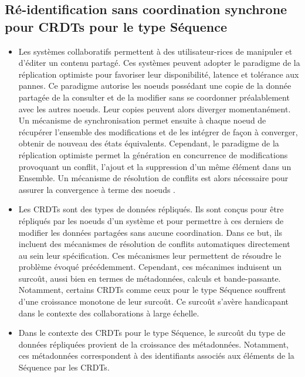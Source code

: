 \subsection{Ré-identification sans coordination synchrone pour \acp{CRDT} pour le type Séquence}

\begin{itemize}
    \item Les systèmes collaboratifs permettent à des utilisateur-rices de manipuler et d'éditer un contenu partagé.
        Ces systèmes peuvent adopter le paradigme de la réplication optimiste \cite{2005-optimistic-replication-saito} pour favoriser leur disponibilité, latence et tolérance aux pannes.
        Ce paradigme autorise les noeuds possédant une copie de la donnée partagée de la consulter et de la modifier sans se coordonner préalablement avec les autres noeuds.
        Leur copies peuvent alors diverger momentanément.
        Un mécanisme de synchronisation permet ensuite à chaque noeud de récupérer l'ensemble des modifications et de les intégrer de façon à converger, \ie obtenir de nouveau des états équivalents.
        Cependant, le paradigme de la réplication optimiste permet la génération en concurrence de modifications provoquant un conflit, \eg l'ajout et la suppression d'un même élément dans un Ensemble.
        Un mécanisme de résolution de conflits est alors nécessaire pour assurer la convergence à terme des noeuds \cite{10.1145/224057.224070}.
    \item Les \acp{CRDT} \cite{2007-crdt-shapiro,shapiro_2011_crdt} sont des types de données répliqués.
        Ils sont conçus pour être répliqués par les noeuds d'un système et pour permettre à ces derniers de modifier les données partagées sans aucune coordination.
        Dans ce but, ils incluent des mécanismes de résolution de conflits automatiques directement au sein leur spécification.
        Ces mécanismes leur permettent de résoudre le problème évoqué précédemment.
        Cependant, ces mécanimes induisent un surcoût, aussi bien en termes de métadonnées, calculs et bande-passante.
        Notamment, certains \acp{CRDT} comme ceux pour le type Séquence souffrent d'une croissance monotone de leur surcoût.
        Ce surcoût s'avère handicapant dans le contexte des collaborations à large échelle.
    \item Dans le contexte des \acp{CRDT} pour le type Séquence, le surcoût du type de données répliquées provient de la croissance des métadonnées.
        Notamment, ces métadonnées correspondent à des identifiants associés aux éléments de la Séquence par les \acp{CRDT}.

\end{itemize}
